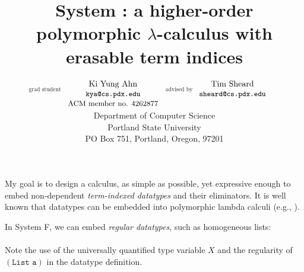 \documentclass{article}
\title{System \Fi: a higher-order polymorphic $\lambda$-calculus
	with erasable term indices \vspace*{-5pt}}
\author{
 $\begin{matrix}_\text{grad student}\\ ~ \\ ~ \end{matrix}\!\!\!\!\!\!\!\!$
 $\begin{matrix}\text{Ki Yung Ahn} \\ \texttt{\small kya@cs.pdx.edu} \\
   \text{\small ACM member no. 4262877}   \end{matrix}$
 $\!\!\!\!\begin{matrix}_\text{advised by}\\ ~ \\ ~ \end{matrix}$
 $\begin{matrix}\text{Tim Sheard} \\ \texttt{\small sheard@cs.pdx.edu} \\ ~ \end{matrix}
 \qquad$
 \vspace*{5pt} \\
 \small Department of Computer Science \\
 \small Portland State University \\ \small PO Box 751, Portland, Oregon, 97201
}
\date{\small \vspace*{-12pt}
 }
\begin{document}
\maketitle \vspace*{-15pt}
My goal is to design a calculus, as simple as possible, yet expressive enough
to embed non-dependent \emph{term-indexed datatypes} and their eliminators.
It is well known that datatypes can be embedded into polymorphic lambda calculi
(e.g., \cite{AbeMatUus03}).

In System \textsf{F}, we can embed \emph{regular datatypes},
such as homogeneous lists:\vspace*{1pt}\\
\vspace*{1pt}\\
Note the use of the universally quantified type variable $X$
and the regularity of $(\texttt{List a})$ in the datatype definition.
\end{document}
